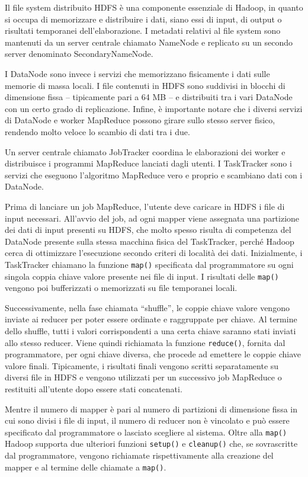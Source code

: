 \documentclass[a4paper,11pt,twoside,openright,fleqn]{book}
\newcommand{\code}[1]{\texttt{#1}}
\begin{document}
Il file system distribuito HDFS è una componente essenziale di Hadoop, in quanto si occupa di memorizzare e distribuire i dati, siano essi di input, di output o risultati temporanei dell'elaborazione. I metadati relativi al file system sono mantenuti da un server centrale chiamato NameNode e replicato su un secondo server denominato SecondaryNameNode.

I DataNode sono invece i servizi che memorizzano fisicamente i dati sulle memorie di massa locali. I file contenuti in HDFS sono suddivisi in blocchi di dimensione fissa -- tipicamente pari a 64 MB -- e distribuiti tra i vari DataNode con un certo grado di replicazione. Infine, è importante notare che i diversi servizi di DataNode e worker MapReduce possono girare sullo stesso server fisico, rendendo molto veloce lo scambio di dati tra i due.

Un server centrale chiamato JobTracker coordina le elaborazioni dei worker e distribuisce i programmi MapReduce lanciati dagli utenti. I TaskTracker sono i servizi che eseguono l'algoritmo MapReduce vero e proprio e scambiano dati con i DataNode.

Prima di lanciare un job MapReduce, l'utente deve caricare in HDFS i file di input necessari. All'avvio del job, ad ogni mapper viene assegnata una partizione dei dati di input presenti su HDFS, che molto spesso risulta di competenza del DataNode presente sulla stessa macchina fisica del TaskTracker, perché Hadoop cerca di ottimizzare l'esecuzione secondo criteri di località dei dati. Inizialmente, i TaskTracker chiamano la funzione \code{map()} specificata dal programmatore su ogni singola coppia chiave valore presente nei file di input. I risultati delle \code{map()} vengono poi bufferizzati o memorizzati su file temporanei locali. 

Successivamente, nella fase chiamata ``shuffle'', le coppie chiave valore vengono inviate ai reducer per poter essere ordinate e raggruppate per chiave. Al termine dello shuffle, tutti i valori corrispondenti a una certa chiave saranno stati inviati allo stesso reducer. Viene quindi richiamata la funzione \code{reduce()}, fornita dal programmatore, per ogni chiave diversa, che procede ad emettere le coppie chiave valore finali. Tipicamente, i risultati finali vengono scritti separatamente su diversi file in HDFS e vengono utilizzati per un successivo job MapReduce o restituiti all'utente dopo essere stati concatenati.

Mentre il numero di mapper è pari al numero di partizioni di dimensione fissa in cui sono divisi i file di input, il numero di reducer non è vincolato e può essere specificato dal programmatore o lasciato scegliere al sistema. Oltre alla \code{map()} Hadoop supporta due ulteriori funzioni \code{setup()} e \code{cleanup()} che, se sovrascritte dal programmatore, vengono richiamate rispettivamente alla creazione del mapper e al termine delle chiamate a \code{map()}.
\end{document}
